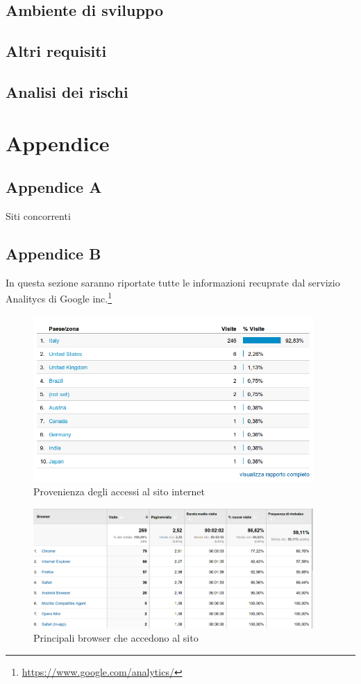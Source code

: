 \documentclass[a4paper,12pt,hidelinks]{report}
\begin{document}
\section{Ambiente di sviluppo}
\section{Altri requisiti}
\section{Analisi dei rischi}

\chapter{Appendice}
\section{Appendice A}
Siti concorrenti
\section{Appendice B}
In questa sezione saranno riportate tutte le informazioni recuprate dal servizio Analitycs di Google inc.\footnote{\url{https://www.google.com/analytics/}}
\begin{figure}[h!]%
	\includegraphics[width=0.95\textwidth,keepaspectratio=true]{img/googleAnalyticsPaesi}
	\centering
	\caption{Provenienza degli accessi al sito internet}%
	\label{fig:googleAnalyticsPaesi}%
\end{figure}
\begin{figure}[h!]%
	\includegraphics[width=0.95\textwidth,keepaspectratio=true]{img/googleAnalyticsBrowser}
	\centering
	\caption{Principali browser che accedono al sito}%
	\label{fig:googleAnalyticsBrowser}%
\end{figure}
\newpage
\end{document}
